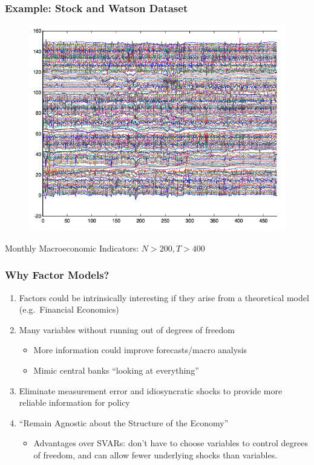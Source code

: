 \documentclass[handout]{beamer}
\begin{document}
\begin{frame}[c]\frametitle{Example: Stock and Watson Dataset}
    

	\begin{figure}
		\centering
		\includegraphics[scale = 0.3]{stock_watson_dataset}
	\end{figure}
Monthly Macroeconomic Indicators: $N > 200, T >400$

\end{frame}

\begin{frame}[c]\frametitle{Why Factor Models?}
   
\begin{enumerate}
	\item Factors could be intrinsically interesting if they arise from a theoretical model (e.g.\ Financial Economics)
	\item Many variables without running out of degrees of freedom\begin{itemize}
			\item More information could improve forecasts/macro analysis
			\item Mimic central banks ``looking at everything'' 
		\end{itemize}
	\item Eliminate measurement error and idiosyncratic shocks to provide more reliable information for policy
	\item ``Remain Agnostic about the Structure of the Economy''\begin{itemize}
		\item Advantages over SVARs: don't have to choose variables to control degrees of freedom, and can allow fewer underlying shocks than variables. 
	\end{itemize}
\end{enumerate}


\end{frame}
\end{document}
